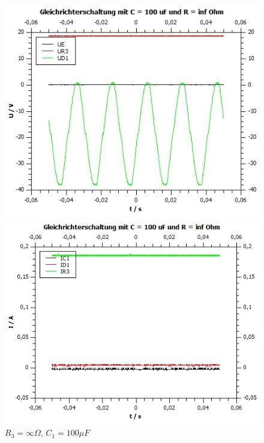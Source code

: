 \documentclass[12pt,a4paper,twoside]{article}
\begin{document}
\begin{figure}[H]
    \begin{minipage}[b]{.5\linewidth} %
        \includegraphics[width=1\linewidth]{nudes/Aufgabe 3 plots/inf ohm 100 uf U.jpg}
        \caption{$R_3 = \infty \Omega$, $C_1 = 100 \mu F$}
    \end{minipage}
    \hspace{0.01\linewidth}%
    \begin{minipage}[b]{.5\linewidth} %
        \includegraphics[width=1\linewidth]{nudes/Aufgabe 3 plots/inf ohm 100 uf I.jpg}
    \caption{$R_3 = \infty \Omega$, $C_1 = 100 \mu F$}
    \end{minipage}
\end{figure}
\end{document}
